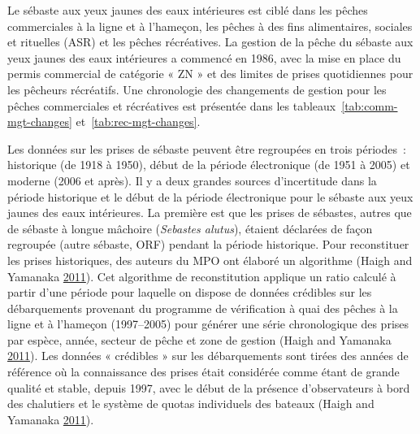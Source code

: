 \documentclass[11pt]{book}
\begin{document}
\clearpage

\label{app:catch-data}

Le sébaste aux yeux jaunes des eaux intérieures est ciblé dans les pêches commerciales à la ligne et à l'hameçon, les pêches à des fins alimentaires, sociales et rituelles (ASR) et les pêches récréatives. La gestion de la pêche du sébaste aux yeux jaunes des eaux intérieures a commencé en 1986, avec la mise en place du permis commercial de catégorie « ZN » et des limites de prises quotidiennes pour les pêcheurs récréatifs. Une chronologie des changements de gestion pour les pêches commerciales et récréatives est présentée dans les tableaux~\ref{tab:comm-mgt-changes} et~\ref{tab:rec-mgt-changes}.

\hypertarget{sec:com-catch-data}{%
\label{sec:com-catch-data}}

Les données sur les prises de sébaste peuvent être regroupées en trois périodes~: historique (de 1918 à 1950), début de la période électronique (de 1951 à 2005) et moderne (2006 et après). Il y a deux grandes sources d'incertitude dans la période historique et le début de la période électronique pour le sébaste aux yeux jaunes des eaux intérieures. La première est que les prises de sébastes, autres que de sébaste à longue mâchoire (\emph{Sebastes alutus}), étaient déclarées de façon regroupée (autre sébaste, ORF) pendant la période historique. Pour reconstituer les prises historiques, des auteurs du MPO ont élaboré un algorithme (Haigh and Yamanaka \protect\hyperlink{ref-haigh2011}{2011}). Cet algorithme de reconstitution applique un ratio calculé à partir d'une période pour laquelle on dispose de données crédibles sur les débarquements provenant du programme de vérification à quai des pêches à la ligne et à l'hameçon (1997--2005) pour générer une série chronologique des prises par espèce, année, secteur de pêche et zone de gestion (Haigh and Yamanaka \protect\hyperlink{ref-haigh2011}{2011}). Les données « crédibles » sur les débarquements sont tirées des années de référence où la connaissance des prises était considérée comme étant de grande qualité et stable, depuis 1997, avec le début de la présence d'observateurs à bord des chalutiers et le système de quotas individuels des bateaux (Haigh and Yamanaka \protect\hyperlink{ref-haigh2011}{2011}).
\end{document}
